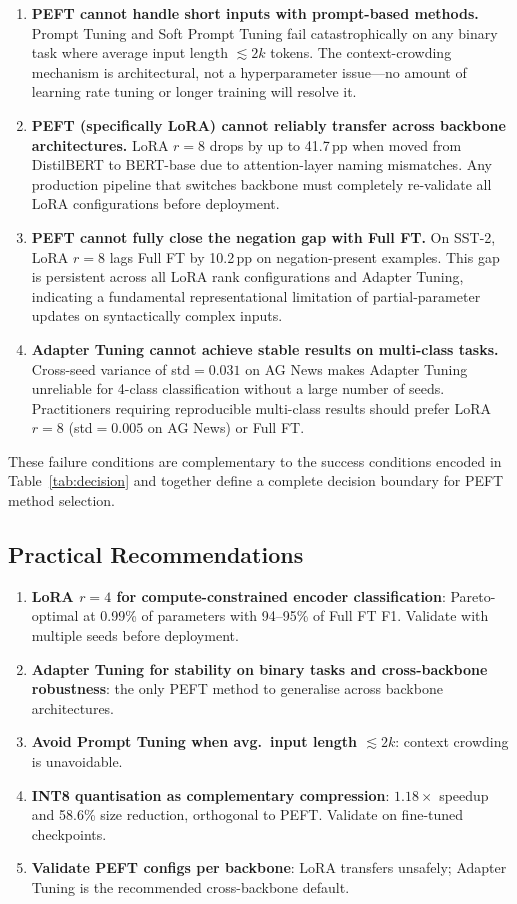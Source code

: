 \documentclass[conference]{IEEEtran}
\begin{document}
\begin{enumerate}
  \item \textbf{PEFT cannot handle short inputs with prompt-based methods.} Prompt Tuning and Soft Prompt Tuning fail catastrophically on any binary task where average input length ${\lesssim}2k$ tokens. The context-crowding mechanism is architectural, not a hyperparameter issue---no amount of learning rate tuning or longer training will resolve it.

  \item \textbf{PEFT (specifically LoRA) cannot reliably transfer across backbone architectures.} LoRA $r{=}8$ drops by up to 41.7\,pp when moved from DistilBERT to BERT-base due to attention-layer naming mismatches. Any production pipeline that switches backbone must completely re-validate all LoRA configurations before deployment.

  \item \textbf{PEFT cannot fully close the negation gap with Full FT.} On SST-2, LoRA $r{=}8$ lags Full FT by 10.2\,pp on negation-present examples. This gap is persistent across all LoRA rank configurations and Adapter Tuning, indicating a fundamental representational limitation of partial-parameter updates on syntactically complex inputs.

  \item \textbf{Adapter Tuning cannot achieve stable results on multi-class tasks.} Cross-seed variance of std$=0.031$ on AG News makes Adapter Tuning unreliable for 4-class classification without a large number of seeds. Practitioners requiring reproducible multi-class results should prefer LoRA $r{=}8$ (std$=0.005$ on AG News) or Full FT.
\end{enumerate}

These failure conditions are complementary to the success conditions encoded in Table~\ref{tab:decision} and together define a complete decision boundary for PEFT method selection.

\subsection{Practical Recommendations}

\begin{enumerate}
  \item \textbf{LoRA $r{=}4$ for compute-constrained encoder classification}: Pareto-optimal at 0.99\% of parameters with 94--95\% of Full FT F1. Validate with multiple seeds before deployment.
  \item \textbf{Adapter Tuning for stability on binary tasks and cross-backbone robustness}: the only PEFT method to generalise across backbone architectures.
  \item \textbf{Avoid Prompt Tuning when avg.\ input length ${\lesssim}2k$}: context crowding is unavoidable.
  \item \textbf{INT8 quantisation as complementary compression}: $1.18\times$ speedup and 58.6\% size reduction, orthogonal to PEFT. Validate on fine-tuned checkpoints.
  \item \textbf{Validate PEFT configs per backbone}: LoRA transfers unsafely; Adapter Tuning is the recommended cross-backbone default.
\end{enumerate}
\end{document}
